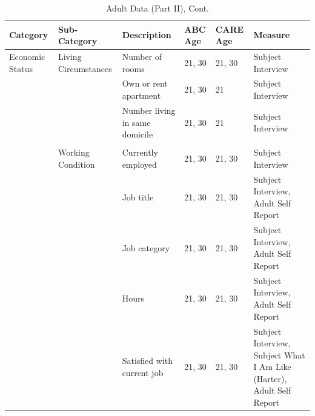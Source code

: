 \documentclass[static]{JJH-Beamer}
\begin{document}
\begin{frame}
 \addtocounter{framenumber}{-1}

\begin{table}[H]
\addtocounter{table}{-1}
\caption{Adult Data (Part II), Cont.}
\begin{center}
\begin{tiny}
\begin{tabular}{L{1.1cm} C{1.4cm} C{2.5cm} C{.8cm} C{.8cm} C{3cm}}
\toprule
\textbf{Category}	&	\textbf{Sub-Category}	&	\textbf{Description}	&	\textbf{ABC Age}  	&  \textbf{CARE Age}  & 	\textbf{Measure}	\\ \midrule										
Economic Status	&	Living Circumstances	&	Number of rooms	&	21, 30	&	21, 30	&	Subject Interview	\\
	&		&	Own or rent apartment	&	21, 30	&	21	&	Subject Interview	\\
	&		&	Number living in same domicile	&	21, 30	&	21	&	Subject Interview	\\
\\											
	&	Working Condition	&	Currently employed	&	21, 30	&	21, 30	&	Subject Interview	\\
	&		&	Job title	&	21, 30	&	21, 30	&	Subject Interview, Adult Self Report	\\
	&		&	Job category	&	21, 30	&	21, 30	&	Subject Interview, Adult Self Report	\\
	&		&	Hours	&	21, 30	&	21, 30	&	Subject Interview, Adult Self Report	\\
	&		&	Satisfied with current job	&	21, 30	&	21, 30	&	Subject Interview, Subject What I Am Like (Harter), Adult Self Report	\\
 \bottomrule
\end{tabular}										
\end{tiny}
\end{center}															
\end{table}

\end{frame}
\end{document}
